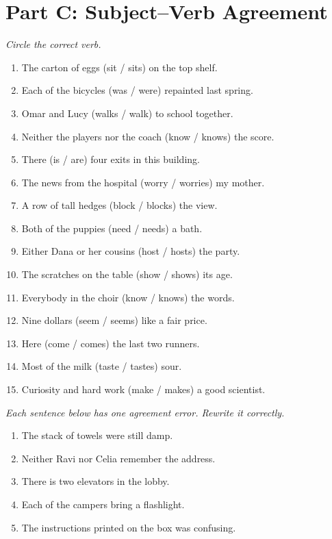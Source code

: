 \documentclass[11pt]{article}
\begin{document}
\newpage
\section*{Part C: Subject--Verb Agreement}
\textit{Circle the correct verb.}
\begin{enumerate}
  \item The carton of eggs (sit / sits) on the top shelf.
  \item Each of the bicycles (was / were) repainted last spring.
  \item Omar and Lucy (walks / walk) to school together.
  \item Neither the players nor the coach (know / knows) the score.
  \item There (is / are) four exits in this building.
  \item The news from the hospital (worry / worries) my mother.
  \item A row of tall hedges (block / blocks) the view.
  \item Both of the puppies (need / needs) a bath.
  \item Either Dana or her cousins (host / hosts) the party.
  \item The scratches on the table (show / shows) its age.
  \item Everybody in the choir (know / knows) the words.
  \item Nine dollars (seem / seems) like a fair price.
  \item Here (come / comes) the last two runners.
  \item Most of the milk (taste / tastes) sour.
  \item Curiosity and hard work (make / makes) a good scientist.
\end{enumerate}

\textit{Each sentence below has one agreement error. Rewrite it correctly.}
\begin{enumerate}[start=16]
  \item The stack of towels were still damp.
  \vspace{0.4in}
  \item Neither Ravi nor Celia remember the address.
  \vspace{0.4in}
  \item There is two elevators in the lobby.
  \vspace{0.4in}
  \item Each of the campers bring a flashlight.
  \vspace{0.4in}
  \item The instructions printed on the box was confusing.
  \vspace{0.4in}
\end{enumerate}
\end{document}
